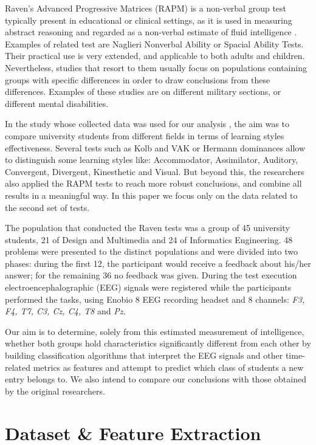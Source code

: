 \documentclass[conference]{IEEEtran}
\begin{document}
Raven's Advanced Progressive Matrices (RAPM) is a non-verbal group test 
typically present in educational or clinical settings, as it is used in 
measuring abstract reasoning and regarded as a non-verbal estimate of fluid 
intelligence \cite{rapm}.
Examples of related test are Naglieri Nonverbal Ability or Spacial Ability Tests.
Their practical use is very extended, and applicable to both adults and children.
Nevertheless, studies that resort to them usually focus on populations containing 
groups with specific differences in order to draw conclusions from these differences.
Examples of these studies are on different military sections, or different 
mental disabilities.

In the study whose collected data was used for our analysis \cite{study}, the 
aim was to compare university students from different fields in terms of 
learning styles effectiveness.
Several tests such as Kolb and VAK or Hermann dominances allow to distinguish
some learning styles like: Accommodator, Assimilator, Auditory, Convergent,
Divergent, Kinesthetic and Visual.
But beyond this, the researchers also applied the RAPM tests to reach more 
robust conclusions, and combine all results in a meaningful way.
In this paper we focus only on the data related to the second set of tests.

The population that conducted the Raven tests was a group of 45 university 
students, 21 of Design and Multimedia and 24 of Informatics Engineering.
48 problems were presented to the distinct populations and were divided into 
two phases: during the first 12, the participant would receive a feedback about 
his/her answer; for the remaining 36 no feedback was given.
During the test execution electroencephalographic (EEG) signals were registered 
while the participants performed the tasks, using Enobio 8 EEG recording headset 
and 8 channels: \textit{F3, F4, T7, C3, Cz, C4, T8} and \textit{Pz}.

Our aim is to determine, solely from this estimated measurement of intelligence,
whether both groups hold characteristics significantly different from each other
by building classification algorithms that interpret the EEG signals and other 
time-related metrics as features and attempt to predict which class of students
a new entry belongs to.
We also intend to compare our conclusions with those obtained by the original researchers.

\section{Dataset \& Feature Extraction}
\end{document}
